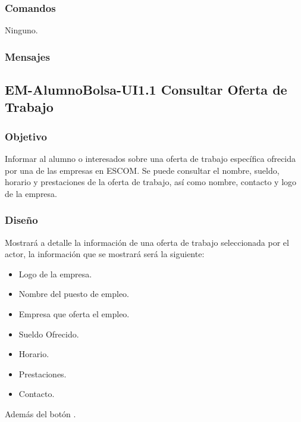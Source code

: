 \subsubsection{Comandos}
	\noindent
	Ninguno.

\subsubsection{Mensajes}
	\noindent




\pagebreak
\subsection{EM-AlumnoBolsa-UI1.1 Consultar Oferta de Trabajo}

\subsubsection{Objetivo}
	\noindent
	Informar al alumno o interesados sobre una oferta de trabajo específica ofrecida por una de las empresas en ESCOM. Se puede consultar el nombre, sueldo, horario y prestaciones de la oferta de trabajo, así como nombre, contacto y logo de la empresa.

\subsubsection{Diseño}
	\noindent
	Mostrará a detalle la información de una oferta de trabajo seleccionada por el actor, la información que se mostrará será la siguiente:
	\begin{itemize}
			\item Logo de la empresa.
			\item Nombre del puesto de empleo.
			\item Empresa que oferta el empleo.
			\item Sueldo Ofrecido.
			\item Horario.
			\item Prestaciones.
			\item Contacto.
	\end{itemize}
	Además del botón .

\pagebreak
{}

